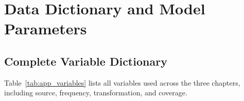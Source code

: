\chapter{Data Dictionary and Model Parameters}
\label{app:data_params}


\section{Complete Variable Dictionary}
\label{app:data_dict}

Table~\ref{tab:app_variables} lists all variables used across the three chapters, including source, frequency, transformation, and coverage.

